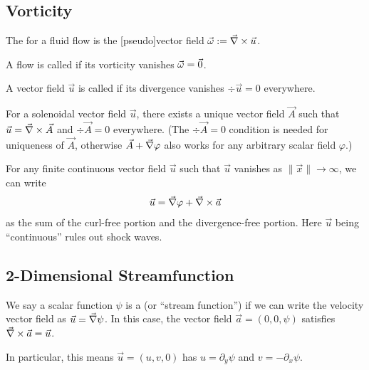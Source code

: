 
\lecture{}

\subsection{Vorticity}

\begin{definition}
The  for a fluid flow is the [pseudo]vector field $\vec{\omega}:=\vec{\nabla}\times\vec{u}$.
\end{definition}


\begin{definition}
A flow is called  if its vorticity vanishes $\vec{\omega}=\vec{0}$.
\end{definition}

\begin{definition}
A vector field $\vec{u}$ is called  if its
divergence vanishes $\div{\vec{u}}=0$ everywhere.
\end{definition}

\begin{recall}
For a solenoidal vector field $\vec{u}$, there exists a unique vector
field $\vec{A}$ such that $\vec{u}=\vec{\nabla}\times\vec{A}$ and
$\div{\vec{A}}=0$ everywhere. (The $\div{\vec{A}}=0$ condition is
needed for uniqueness of $\vec{A}$, otherwise
$\vec{A}+\vec{\nabla}\varphi$ also works for any arbitrary scalar field $\varphi$.)
\end{recall}

\begin{node}
For any finite continuous vector field $\vec{u}$ such that $\vec{u}$
vanishes as $\|\vec{x}\|\to\infty$, we can write
\begin{equation}
\vec{u}=\vec{\nabla}\varphi+\vec{\nabla}\times\vec{a}
\end{equation}
as the sum of the curl-free portion and the divergence-free
portion. Here $\vec{u}$ being ``continuous'' rules out shock waves.
\end{node}

\subsection{2-Dimensional Streamfunction}

\begin{definition}
We say a scalar function $\psi$ is a  (or
``stream function'') if we can write the velocity vector field as
$\vec{u}=\vec{\nabla}\psi$. In this case, the vector field
$\vec{a}=(0,0,\psi)$ satisfies $\vec{\nabla}\times\vec{a}=\vec{u}$.

In particular, this means $\vec{u}=(u,v,0)$ has $u=\partial_{y}\psi$
and $v=-\partial_{x}\psi$.
\end{definition}

